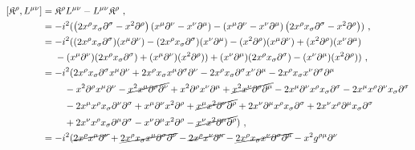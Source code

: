\documentclass[12pt,a4paper]{report}
\begin{document}
\begin{align*}
    \left[\mathfrak{K}^{{\rho}},L^{{\mu}{\nu}}\right]&=\mathfrak{K}^{{\rho}}L^{{\mu}{\nu}}-L^{{\mu}{\nu}}\mathfrak{K}^{{\rho}}~,\\
    &=-i^2(\left(2x^{{\rho}}x_{{\sigma}}\partial^{{\sigma}}-x^2\partial^{{\rho}}\right)\left(x^{{\mu}}\partial^{{\nu}}-x^{{\nu}}\partial^{{\mu}}\right)-\left(x^{{\mu}}\partial^{{\nu}}-x^{{\nu}}\partial^{{\mu}}\right)\left(2x^{{\rho}}x_{{\sigma}}\partial^{{\sigma}}-x^2\partial^{{\rho}}\right))~,\\
    &=-i^2((2x^{{\rho}}x_{{\sigma}}\partial^{{\sigma}})(x^{{\mu}}\partial^{{\nu}})-(2x^{{\rho}}x_{{\sigma}}\partial^{{\sigma}})(x^{{\nu}}\partial^{{\mu}})-(x^2\partial^{{\rho}})(x^{{\mu}}\partial^{{\nu}})+(x^2\partial^{{\rho}})(x^{{\nu}}\partial^{{\mu}})\nonumber\\
    &~~~~-(x^{{\mu}}\partial^{{\nu}})(2x^{{\rho}}x_{{\sigma}}\partial^{{\sigma}})+(x^{{\mu}}\partial^{{\nu}})(x^2\partial^{{\rho}}))+(x^{{\nu}}\partial^{{\mu}})(2x^{{\rho}}x_{{\sigma}}\partial^{{\sigma}})-(x^{{\nu}}\partial^{{\mu}})(x^2\partial^{{\rho}}))~,\\
    &=-i^2(2x^{{\rho}}x_{{\sigma}}\partial^{{\sigma}}x^{{\mu}}\partial^{{\nu}}+2x^{{\rho}}x_{{\sigma}}x^{{\mu}}\partial^{{\sigma}}\partial^{{\nu}}-2x^{{\rho}}x_{{\sigma}}\partial^{{\sigma}}x^{{\nu}}\partial^{{\mu}}-2x^{{\rho}}x_{{\sigma}}x^{{\nu}}\partial^{{\sigma}}\partial^{{\mu}}\nonumber\\
    &~~~~~~~-x^2\partial^{{\rho}}x^{{\mu}}\partial^{{\nu}}-\cancel{x^2x^{{\mu}}\partial^{{\rho}}\partial^{{\nu}}}+x^2\partial^{{\rho}}x^{{\nu}}\partial^{{\mu}}+\cancel{x^2x^{{\nu}}\partial^{{\rho}}\partial^{{\mu}}}-2x^{{\mu}}\partial^{{\nu}}x^{{\rho}}x_{{\sigma}}\partial^{{\sigma}}-2x^{{\mu}}x^{{\rho}}\partial^{{\nu}}x_{{\sigma}}\partial^{{\sigma}}\nonumber\\
    &~~~~~~~-2x^{{\mu}}x^{{\rho}}x_{{\sigma}}\partial^{{\nu}}\partial^{{\sigma}}+x^{{\mu}}\partial^{{\nu}}x^2\partial^{{\rho}}+\cancel{x^{{\mu}}x^2\partial^{{\nu}}\partial^{{\rho}}}+2x^{{\nu}}\partial^{{\mu}}x^{{\rho}}x_{{\sigma}}\partial^{{\sigma}}+2x^{{\nu}}x^{{\rho}}\partial^{{\mu}}x_{{\sigma}}\partial^{{\sigma}}\nonumber\\
    &~~~~~~~+2x^{{\nu}}x^{{\rho}}x_{{\sigma}}\partial^{{\mu}}\partial^{{\sigma}}-x^{{\nu}}\partial^{{\mu}}x^2\partial^{{\rho}}-\cancel{x^{{\nu}}x^2\partial^{{\mu}}\partial^{{\rho}}})~,\\
    &=-i^2(\cancel{2x^{{\rho}}x^{{\mu}}\partial^{{\nu}}}+\cancel{2x^{{\rho}}x_{{\sigma}}x^{{\mu}}\partial^{{\sigma}}\partial^{{\nu}}}-\cancel{2x^{{\rho}}x^{{\nu}}\partial^{{\mu}}}-\cancel{2x^{{\rho}}x_{{\sigma}}x^{{\nu}}\partial^{{\sigma}}\partial^{{\mu}}}-x^2g^{{\rho}{\mu}}\partial^{{\nu}}\nonumber\\

\end{align*}
\end{document}
